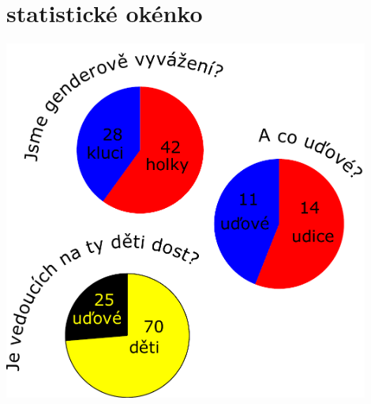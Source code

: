 \chapter{statistické okénko}
\label{statistika}

\begin{center}

\includegraphics[width=12cm]{img/statistika/grafy-kolacove.pdf}

\end{center}

\clearpage